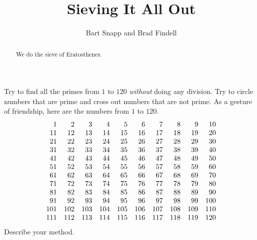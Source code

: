 \documentclass[nooutcomes]{ximera}
\title{Sieving It All Out}
\author{Bart Snapp and Brad Findell}
\begin{document}
\begin{abstract}
We do the sieve of Eratosthenes.
\end{abstract}
\maketitle
\label{A:Sieve}

\begin{problem} 
Try to find all the primes from $1$ to $120$ \textit{without}
doing any division.  Try to circle numbers that are prime and 
cross out numbers that are not prime.  
As a gesture of friendship, here are the numbers from $1$ to $120$.
\[
\begin{array}{r r r r r r r r r r}
  1 &   2 &   3 &   4 &   5 &   6 &   7 &   8 &   9 &  10\\
 11 &  12 &  13 &  14 &  15 &  16 &  17 &  18 &  19 &  20\\
 21 &  22 &  23 &  24 &  25 &  26 &  27 &  28 &  29 &  30\\
 31 &  32 &  33 &  34 &  35 &  36 &  37 &  38 &  39 &  40\\
 41 &  42 &  43 &  44 &  45 &  46 &  47 &  48 &  49 &  50\\
 51 &  52 &  53 &  54 &  55 &  56 &  57 &  58 &  59 &  60\\
 61 &  62 &  63 &  64 &  65 &  66 &  67 &  68 &  69 &  70\\
 71 &  72 &  73 &  74 &  75 &  76 &  77 &  78 &  79 &  80\\
 81 &  82 &  83 &  84 &  85 &  86 &  87 &  88 &  89 &  90\\
 91 &  92 &  93 &  94 &  95 &  96 &  97 &  98 &  99 & 100\\
101 & 102 & 103 & 104 & 105 & 106 & 107 & 108 & 109 & 110\\
111 & 112 & 113 & 114 & 115 & 116 & 117 & 118 & 119 & 120\\
\end{array}
\]
Describe your method.  
\end{problem}

\newpage
\end{document}
